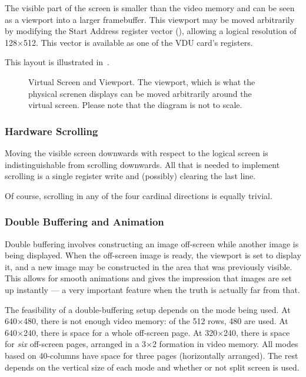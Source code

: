 The visible part of the screen is smaller than the video memory and can be seen
as a viewport into a larger framebuffer. This viewport may be moved arbitrarily
by modifying the Start Address register vector (), allowing a
logical resolution of 128×512. This vector is available as one of the VDU
card's registers.

This layout is illustrated in~.


\begin{figure}
 \centering
 
 \caption[Virtual Screen]{\label{fig:vdu-virtual-screen} Virtual Screen and
   Viewport. The viewport, which is what the physical screnen displays can be
   moved arbitrarily around the virtual screen. Please note that the diagram is not to scale.
 }
\end{figure}




\subsubsection{Hardware Scrolling}

Moving the visible screen downwards with respect to the logical screen is
indistinguishable from scrolling downwards. All that is needed to implement
scrolling is a single register write and (possibly) clearing the last line.

Of course, scrolling in any of the four cardinal directions is equally trivial.

\subsubsection{Double Buffering and Animation}

Double buffering involves constructing an image off-screen while another image
is being displayed. When the off-screen image is ready, the viewport is set to
display it, and a new image may be constructed in the area that was previously
visible. This allows for smooth animations and gives the impression that images
are set up instantly — a very important feature when the truth is actually far
from that.

The feasibility of a double-buffering setup depends on the mode being used. At
640×480, there is not enough video memory: of the 512 rows, 480 are used. At
640×240, there is space for a whole off-screen page. At 320×240, there is space
for {\em six\/} off-screen pages, arranged in a 3×2 formation in video
memory. All modes based on 40-columns have space for three pages (horizontally
arranged). The rest depends on the vertical size of each mode and whether or
not split screen is used.

